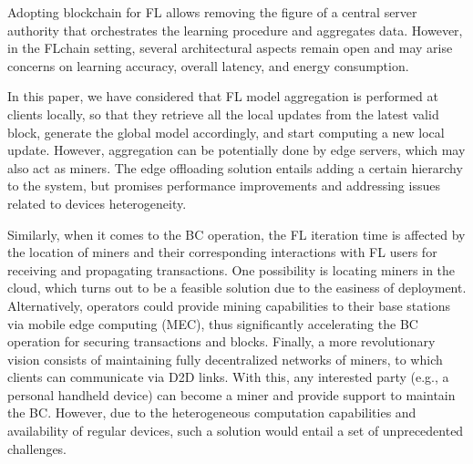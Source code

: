 \documentclass[10pt,journal,compsoc]{IEEEtran}
\begin{document}
Adopting blockchain for FL allows removing the figure of a central server authority that orchestrates the learning procedure and aggregates data. However, in the FLchain setting, several architectural aspects remain open and may arise concerns on learning accuracy, overall latency, and energy consumption.

In this paper, we have considered that FL model aggregation is performed at clients locally, so that they retrieve all the local updates from the latest valid block, generate the global model accordingly, and start computing a new local update. However, aggregation can be potentially done by edge servers, which may also act as miners. The edge offloading solution entails adding a certain hierarchy to the system, but promises performance improvements and addressing issues related to devices heterogeneity.

Similarly, when it comes to the BC operation, the FL iteration time is affected by the location of miners and their corresponding interactions with FL users for receiving and propagating transactions. One possibility is locating miners in the cloud, which turns out to be a feasible solution due to the easiness of deployment. Alternatively, operators could provide mining capabilities to their base stations via mobile edge computing (MEC), thus significantly accelerating the BC operation for securing transactions and blocks. Finally, a more revolutionary vision consists of maintaining fully decentralized networks of miners, to which clients can communicate via D2D links. With this, any interested party (e.g., a personal handheld device) can become a miner and provide support to maintain the BC. However, due to the heterogeneous computation capabilities and availability of regular devices, such a solution would entail a set of unprecedented challenges.
\end{document}
